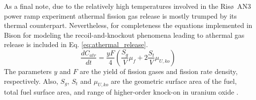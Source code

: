 As a final note, due to the relatively high temperatures involved in the Ris\o~AN3 power ramp experiment athermal fission gas release is mostly trumped by its thermal counterpart. Nevertheless, for completeness the equations implemented in Bison for modeling the recoil-and-knockout phenomena leading to athermal gas release is included in Eq. \ref{eq:athermal_release}. 
\begin{equation}
\label{eq:athermal_release}
 \frac{dC_{atr}}{dt} = \frac{yF}{4} \left( \frac{S_g}{V} \mu_f +2 \frac{S_t}{V}\mu_{U,ko}\right)  
\end{equation}
The parameters $y$ and $F$ are the yield of fission gases and fission rate density, respectively. Also, $S_g$, $S_t$ and $\mu_{U,ko}$ are the geometric surface area of the fuel, total fuel surface area, and range of higher-order knock-on in uranium oxide \cite{Pastore2}. 

  


